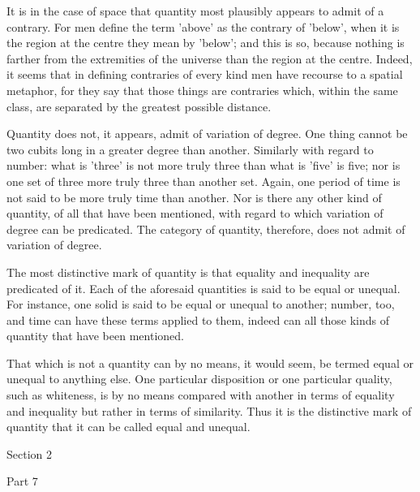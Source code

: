 It is in the case of space that quantity most plausibly appears to
admit of a contrary. For men define the term 'above' as the contrary of
'below', when it is the region at the centre they mean by 'below'; and
this is so, because nothing is farther from the extremities of the
universe than the region at the centre. Indeed, it seems that in
defining contraries of every kind men have recourse to a spatial
metaphor, for they say that those things are contraries which, within
the same class, are separated by the greatest possible distance.

Quantity does not, it appears, admit of variation of degree. One thing
cannot be two cubits long in a greater degree than another. Similarly
with regard to number: what is 'three' is not more truly three than
what is 'five' is five; nor is one set of three more truly three than
another set. Again, one period of time is not said to be more truly
time than another. Nor is there any other kind of quantity, of all that
have been mentioned, with regard to which variation of degree can be
predicated. The category of quantity, therefore, does not admit of
variation of degree.

The most distinctive mark of quantity is that equality and inequality
are predicated of it. Each of the aforesaid quantities is said to be
equal or unequal. For instance, one solid is said to be equal or
unequal to another; number, too, and time can have these terms applied
to them, indeed can all those kinds of quantity that have been
mentioned.

That which is not a quantity can by no means, it would seem, be termed
equal or unequal to anything else. One particular disposition or one
particular quality, such as whiteness, is by no means compared with
another in terms of equality and inequality but rather in terms of
similarity. Thus it is the distinctive mark of quantity that it can be
called equal and unequal.



Section 2


Part 7

